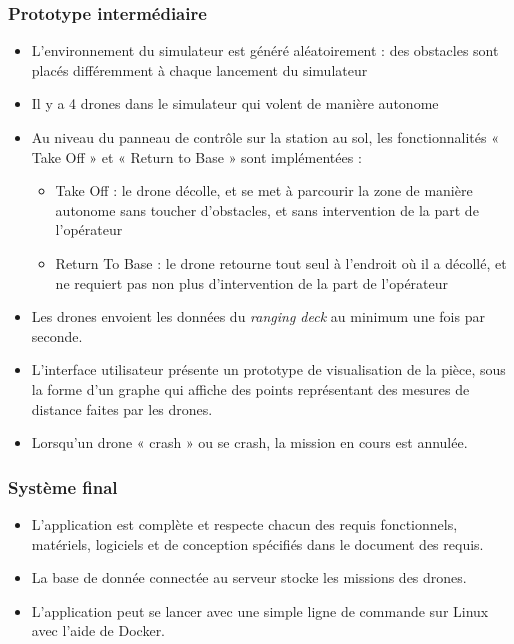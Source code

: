 \documentclass{mistcoursedoc}
\begin{document}
\subsubsection{Prototype intermédiaire}
\begin{itemize}
  \item L'environnement du simulateur est généré aléatoirement : des obstacles sont placés différemment à chaque lancement du simulateur
  \item Il y a 4 drones dans le simulateur qui volent de manière autonome
  \item Au niveau du panneau de contrôle sur la station au sol, les fonctionnalités « Take Off » et « Return to Base » sont implémentées :
        \begin{itemize}
          \item Take Off : le drone décolle, et se met à parcourir la zone de manière autonome sans toucher d'obstacles, et sans intervention de la part de l'opérateur
          \item Return To Base : le drone retourne tout seul à l'endroit où il a décollé, et ne requiert pas non plus d'intervention de la part de l'opérateur
        \end{itemize}

  \item Les drones envoient les données du \textit{ranging deck} au minimum une fois par seconde.
  \item L'interface utilisateur présente un prototype de visualisation de la pièce, sous la forme d'un graphe qui affiche des points représentant des mesures de distance faites par les drones.
  \item Lorsqu'un drone « crash » ou se crash, la mission en cours est annulée.
\end{itemize}

\subsubsection{Système final}
\begin{itemize}
  \item L'application est complète et respecte chacun des requis fonctionnels, matériels, logiciels et de conception spécifiés dans le document des requis.
  \item La base de donnée connectée au serveur stocke les missions des drones.
  \item L'application peut se lancer avec une simple ligne de commande sur Linux avec l'aide de Docker.
\end{itemize}
\end{document}
